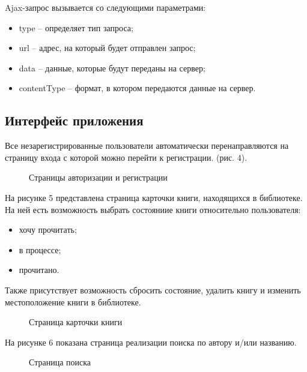 Ajax-запрос вызывается со следующими параметрами:
\begin{itemize}
	\item type – определяет тип запроса;
	\item url – адрес, на который будет отправлен запрос;
	\item data – данные, которые будут переданы на сервер;
	\item contentType – формат, в котором передаются данные на сервер.
\end{itemize}


\subsection{Интерфейс приложения}%
\setcounter{subsection}{5}

Все незарегистрированные пользователи автоматически перенаправляются на страницу входа с которой можно перейти к регистрации. (рис. 4).

\begin{figure}[H]
\caption{Страницы авторизации и регистрации}
\label{fig:image}
\end{figure}





На рисунке 5 представлена страница карточки книги, находящихся в библиотеке. На ней есть возможность выбрать состояниие книги относительно пользователя:
\begin{itemize}
	\item хочу прочитать;
	\item в процессе;
	\item прочитано.
\end{itemize}

Также присутствует возможность сбросить состояние, удалить книгу и изменить местоположение книги в библиотеке. 

\begin{figure}[H]
\caption{Страница карточки книги}
\label{fig:image}
\end{figure}

На рисунке 6 показана страница реализации поиска по автору и/или названию.

\begin{figure}[H]
\caption{Страница поиска}
\label{fig:image}
\end{figure}

